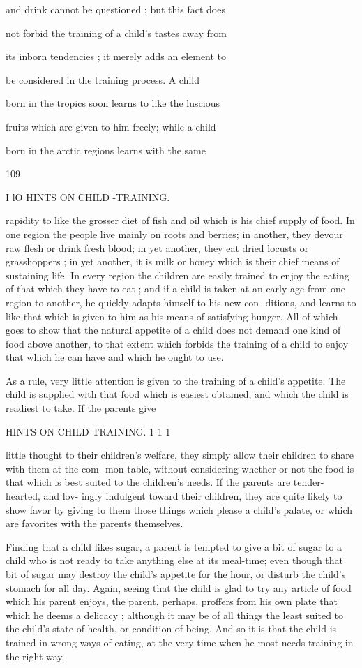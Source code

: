 \documentclass[
]{book}
\begin{document}
and drink cannot be questioned ; but this fact does

not forbid the training of a child's tastes away from

its inborn tendencies ; it merely adds an element to

be considered in the training process. A child

born in the tropics soon learns to like the luscious

fruits which are given to him freely; while a child

born in the arctic regions learns with the same

109

I lO HINTS ON CHILD -TRAINING.

rapidity to like the grosser diet of fish and oil which is his chief supply of food. In one region the people live mainly on roots and berries; in another, they devour raw flesh or drink fresh blood; in yet another, they eat dried locusts or grasshoppers ; in yet another, it is milk or honey which is their chief means of sustaining life. In every region the children are easily trained to enjoy the eating of that which they have to eat ; and if a child is taken at an early age from one region to another, he quickly adapts himself to his new con- ditions, and learns to like that which is given to him as his means of satisfying hunger. All of which goes to show that the natural appetite of a child does not demand one kind of food above another, to that extent which forbids the training of a child to enjoy that which he can have and which he ought to use.

As a rule, very little attention is given to the training of a child's appetite. The child is supplied with that food which is easiest obtained, and which the child is readiest to take. If the parents give

HINTS ON CHILD-TRAINING. 1 1 1

little thought to their children's welfare, they simply allow their children to share with them at the com- mon table, without considering whether or not the food is that which is best suited to the children's needs. If the parents are tender-hearted, and lov- ingly indulgent toward their children, they are quite likely to show favor by giving to them those things which please a child's palate, or which are favorites with the parents themselves.

Finding that a child likes sugar, a parent is tempted to give a bit of sugar to a child who is not ready to take anything else at its meal-time; even though that bit of sugar may destroy the child's appetite for the hour, or disturb the child's stomach for all day. Again, seeing that the child is glad to try any article of food which his parent enjoys, the parent, perhaps, proffers from his own plate that which he deems a delicacy ; although it may be of all things the least suited to the child's state of health, or condition of being. And so it is that the child is trained in wrong ways of eating, at the very time when he most needs training in the right way.
\end{document}
